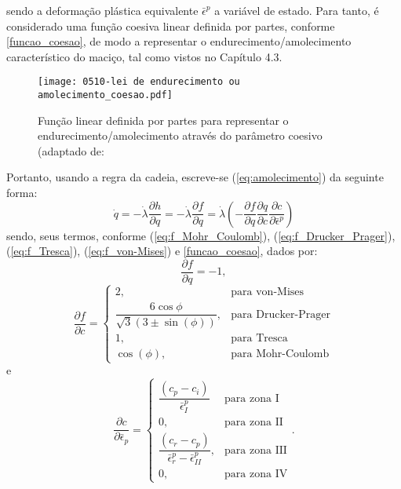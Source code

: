 sendo a deformação plástica equivalente $\bar \epsilon^p$ a variável de estado. Para tanto, é considerado uma função coesiva linear definida por partes, conforme \autoref{funcao_coesao}, de modo a representar o endurecimento/amolecimento característico do maciço, tal como vistos no Capítulo 4.3.
\begin{figure}[H]
	\begin{center}
		\texttt{[image: 0510-lei de endurecimento ou amolecimento\_coesao.pdf]}
	\end{center}
	\caption{\label{funcao_coesao}Função linear definida por partes para representar o endurecimento/amolecimento através do parâmetro coesivo (adaptado de: }
\end{figure}
Portanto, usando a regra da cadeia, escreve-se (\ref{eq:amolecimento}) da seguinte forma:
\begin{equation}
	\label{eq:expressao_amolecimento}
	\dot q = - \dot \lambda \dfrac{\partial h}{\partial q} = - \dot \lambda \dfrac{\partial f}{\partial q} = \dot \lambda \left(- \dfrac{\partial f}{\partial q}\dfrac{\partial q}{\partial c}\dfrac{\partial c}{\partial \bar \epsilon^p}\right)	
\end{equation}
sendo, seus termos, conforme (\ref{eq:f_Mohr_Coulomb}), (\ref{eq:f_Drucker_Prager}), (\ref{eq:f_Tresca}), (\ref{eq:f_von-Mises}) e \autoref{funcao_coesao}, dados por:
\begin{equation}
	\label{eq:dfdq}
	\dfrac{\partial f}{\partial q} = -1,
\end{equation}
\begin{equation}
	\label{eq:dqdc}
	\dfrac{\partial f}{\partial c} = \left\{ \begin{array}{ll} 
		2, & \text{para von-Mises} \\
		\dfrac{6\cos{\phi}}{\sqrt{3}(3\pm \sin(\phi))}, & \text{para Drucker-Prager} \\
		1, & \text{para Tresca} \\ 
		\cos(\phi), & \text{para Mohr-Coulomb}\end{array}	
	\right.
\end{equation}
e
\begin{equation}
	\label{eq:dqde}
	\dfrac{\partial c}{\partial \bar \epsilon_{p}} = \left\{ \begin{array}{ll} \dfrac{(c_p-c_i)}{\bar \epsilon^p_I} &  \text{para zona I} \\ 
	0, & \text{para zona II} \\
	\dfrac{(c_r-c_p)}{\bar \epsilon^p_{r}-\bar \epsilon^p_{II}}, & \text{para zona III} \\	
	0, & \text{para zona IV}
\end{array}\right..
\end{equation}

